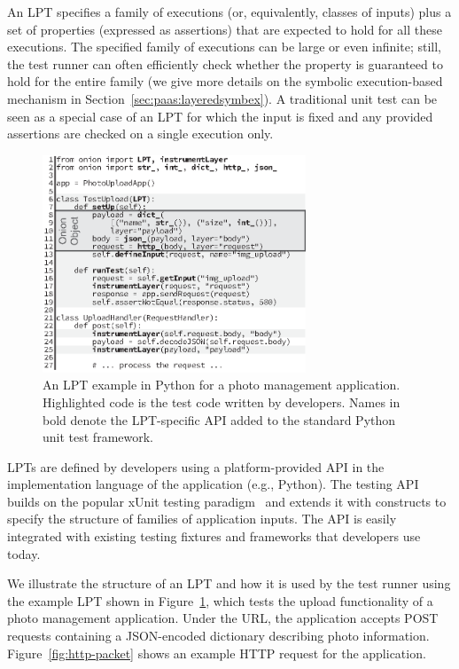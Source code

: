 An LPT specifies a family of executions (or, equivalently, classes of inputs) plus a set of properties (expressed as assertions) that are expected to hold for all these executions.
%
The specified family of executions can be large or even infinite; still, the test runner can often efficiently check whether the property is guaranteed to hold for the entire family (we give more details on the symbolic execution-based mechanism in Section~\ref{sec:paas:layeredsymbex}).  A traditional unit test can be seen as a special case of an LPT for which the input is fixed and any provided assertions are checked on a single execution only.

\begin{figure}
  \centering
  \includegraphics[width=0.7\textwidth]{paas/figures/overlay}
  \caption{An LPT example in Python for a photo management application.  Highlighted code is the test code written by developers.  Names in bold denote the LPT-specific API added to the standard Python unit test framework.}
  \label{fig:test-lpt}
\end{figure}

 LPTs are defined by developers using a platform-provided API in the implementation language of the application (e.g., Python).  The testing API builds on the popular xUnit testing paradigm~\cite{xunit} and extends it with constructs to specify the structure of families of application inputs.  The API is easily integrated with existing testing fixtures and frameworks that developers use today.

We illustrate the structure of an LPT and how it is used by the test runner using the example LPT  shown in Figure~\ref{fig:test-lpt}, which tests the upload functionality of a photo management application.  Under the  URL, the application accepts POST requests containing a JSON-encoded dictionary describing photo information.  Figure~\ref{fig:http-packet} shows an example HTTP request for the application.

